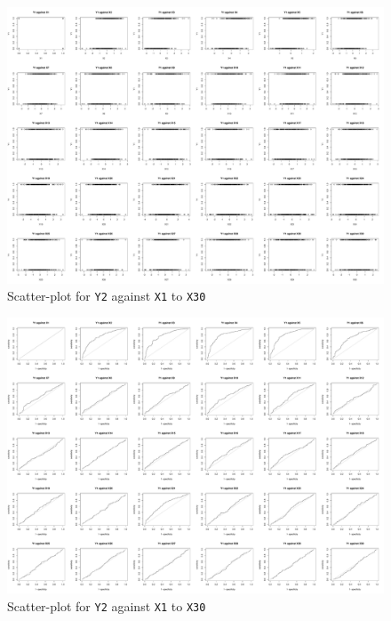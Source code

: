 \documentclass[11pt,oneside,a4paper]{article}
\newcommand{\m}[1]{\texttt{{#1}}}
\begin{document}
\begin{landscape}
\begin{figure}[!ht]
    \centering
	\includegraphics[scale=0.3]{./pic/class_scatterPlot.pdf}
    \caption{Scatter-plot for \m{Y2} against \m{X1} to \m{X30}}
 	\label{scatterY2}
\end{figure}
\end{landscape}

\begin{landscape}
\begin{figure}[!ht]
    \centering
	\includegraphics[scale=0.3]{./pic/class_AUCPlot.pdf}
    \caption{Scatter-plot for \m{Y2} against \m{X1} to \m{X30}}
 	\label{rocY2}
\end{figure}
\end{landscape}
\end{document}
